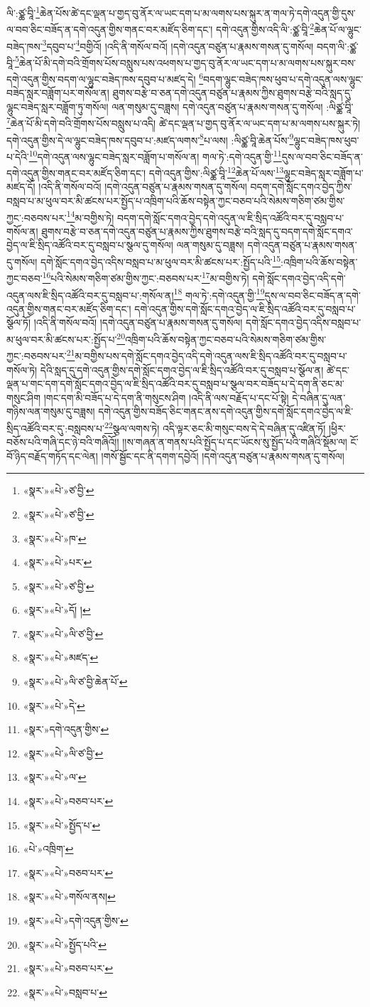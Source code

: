 ལི་:ཙྪ་བཱི་\footnote{«སྣར་»«པེ་»ཙ་བྱི་}ཆེན་པོས་ཚེ་དང་ལྡན་པ་གྱད་བུ་ནོར་ལ་ཡང་དག་པ་མ་ལགས་པས་སྐུར་ན་གལ་ཏེ་དགེ་འདུན་གྱི་དུས་ལ་བབ་ཅིང་བཟོད་ན་དགེ་འདུན་གྱིས་གནང་བར་མཛོད་ཅིག་དང་། དགེ་འདུན་གྱིས་འདི་ལི་:ཙྪ་བཱི་\footnote{«སྣར་»«པེ་»ཙ་བྱི་}ཆེན་པོ་ལ་ལྷུང་བཟེད་ཁས་\footnote{«སྣར་»«པེ་»ཁ་}དབུབ་པ་\footnote{«སྣར་»«པེ་»པར་}བགྱིའོ། །འདི་ནི་གསོལ་བའོ། །དགེ་འདུན་བཙུན་པ་རྣམས་གསན་དུ་གསོལ། བདག་ལི་:ཙྪ་བཱི་\footnote{«སྣར་»«པེ་»ཙ་བྱི་}ཆེན་པོ་མི་དགེ་བའི་གྲོགས་པོས་བསླུས་པས་འཕགས་པ་གྱད་བུ་ནོར་ལ་ཡང་དག་པ་མ་ལགས་པས་སྐུར་བས་དགེ་འདུན་གྱིས་བདག་ལ་ལྷུང་བཟེད་ཁས་དབུབ་པ་མཛད་དེ། \footnote{«སྣར་»«པེ་»དོ། ། }བདག་ལྷུང་བཟེད་ཁས་ཕུབ་པ་དགེ་འདུན་ལས་ལྷུང་བཟེད་སླར་བཟློག་པར་གསོལ་ན། ཐུགས་བརྩེ་བ་ཅན་དགེ་འདུན་བཙུན་པ་རྣམས་ཀྱིས་ཐུགས་བརྩེ་བའི་སླད་དུ་ལྷུང་བཟེད་སླར་བཟློག་ཏུ་གསོལ། ལན་གསུམ་དུ་བཟླས། དགེ་འདུན་བཙུན་པ་རྣམས་གསན་དུ་གསོལ། :ལིཙྪ་བཱི་\footnote{«སྣར་»«པེ་»ལི་ཙ་བྱི་}ཆེན་པོ་མི་དགེ་བའི་གྲོགས་པོས་བསླུས་པ་འདི། ཚེ་དང་ལྡན་པ་གྱད་བུ་ནོར་ལ་ཡང་དག་པ་མ་ལགས་པས་སྐུར་ཏེ། དགེ་འདུན་གྱིས་དེ་ལ་ལྷུང་བཟེད་ཁས་དབུབ་པ་:མཛད་ལགས་\footnote{«སྣར་»«པེ་»མཛད་}པ་ལས། :ལིཙྪ་བཱི་ཆེན་པོས་\footnote{«སྣར་»«པེ་»ལི་ཙ་བྱི་ཆེན་པོ་}ལྷུང་བཟེད་ཁས་ཕུབ་པ་དེའི་\footnote{«སྣར་»«པེ་»དེ་}དགེ་འདུན་ལས་ལྷུང་བཟེད་སླར་བཟློག་པ་གསོལ་ན། གལ་ཏེ་:དགེ་འདུན་གྱི་\footnote{«སྣར་»དགེ་འདུན་གྱིས་}དུས་ལ་བབ་ཅིང་བཟོད་ན་དགེ་འདུན་གྱིས་གནང་བར་མཛོད་ཅིག་དང་། དགེ་འདུན་གྱིས་:ལིཙྪ་བཱི་\footnote{«སྣར་»«པེ་»ལི་ཙ་བྱི་}ཆེན་པོ་ལས་\footnote{«སྣར་»«པེ་»ལ་}ལྷུང་བཟེད་སླར་བཟློག་པ་མཛད་དོ། །འདི་ནི་གསོལ་བའོ། །དགེ་འདུན་བཙུན་པ་རྣམས་གསན་དུ་གསོལ། བདག་དགེ་སློང་དགའ་བྱེད་ཀྱིས་བསླབ་པ་མ་ཕུལ་བར་མི་ཚངས་པར་སྤྱོད་པ་འཁྲིག་པའི་ཆོས་བསྟེན་ཀྱང་བཅབ་པའི་སེམས་གཅིག་ཙམ་གྱིས་ཀྱང་:བཅབས་པར་\footnote{«སྣར་»«པེ་»བཅབ་པར་}མ་བགྱིས་ཏེ། བདག་དགེ་སློང་དགའ་བྱེད་དགེ་འདུན་ལ་ཇི་སྲིད་འཚོའི་བར་དུ་བསླབ་པ་གསོལ་ན། ཐུགས་བརྩེ་བ་ཅན་དགེ་འདུན་བཙུན་པ་རྣམས་ཀྱིས་ཐུགས་བརྩེ་བའི་སླད་དུ་བདག་དགེ་སློང་དགའ་བྱེད་ལ་ཇི་སྲིད་འཚོའི་བར་དུ་བསླབ་པ་སྩལ་དུ་གསོལ། ལན་གསུམ་དུ་བཟླས། དགེ་འདུན་བཙུན་པ་རྣམས་གསན་དུ་གསོལ། དགེ་སློང་དགའ་བྱེད་འདིས་བསླབ་པ་མ་ཕུལ་བར་མི་ཚངས་པར་:སྤྱོད་པའི་\footnote{«སྣར་»«པེ་»སྤྱོད་པ་}:འཁྲིག་པའི་ཆོས་བསྟེན་ཀྱང་བཅབ་\footnote{«པེ་»འཁྲིག་}པའི་སེམས་གཅིག་ཙམ་གྱིས་ཀྱང་:བཅབས་པར་\footnote{«སྣར་»«པེ་»བཅབ་པར་}མ་བགྱིས་ཏེ། དགེ་སློང་དགའ་བྱེད་འདི་དགེ་འདུན་ལས་ཇི་སྲིད་འཚོའི་བར་དུ་བསླབ་པ་:གསོལ་ན།\footnote{«སྣར་»«པེ་»གསོལ་ནས།} གལ་ཏེ་:དགེ་འདུན་གྱི་\footnote{«སྣར་»«པེ་»དགེ་འདུན་གྱིས་}དུས་ལ་བབ་ཅིང་བཟོད་ན་དགེ་འདུན་གྱིས་གནང་བར་མཛོད་ཅིག་དང་། དགེ་འདུན་གྱིས་དགེ་སློང་དགའ་བྱེད་ལ་ཇི་སྲིད་འཚོའི་བར་དུ་བསླབ་པ་སྩོལ་ཏོ། །འདི་ནི་གསོལ་བའོ། །དགེ་འདུན་བཙུན་པ་རྣམས་གསན་དུ་གསོལ། དགེ་སློང་དགའ་བྱེད་འདིས་བསླབ་པ་མ་ཕུལ་བར་མི་ཚངས་པར་:སྤྱོད་པ་\footnote{«སྣར་»«པེ་»སྤྱོད་པའི་}འཁྲིག་པའི་ཆོས་བསྟེན་ཀྱང་བཅབ་པའི་སེམས་གཅིག་ཙམ་གྱིས་ཀྱང་:བཅབས་པར་\footnote{«སྣར་»«པེ་»བཅབ་པར་}མ་བགྱིས་པས་དགེ་སློང་དགའ་བྱེད་འདི་དགེ་འདུན་ལས་ཇི་སྲིད་འཚོའི་བར་དུ་བསླབ་པ་གསོལ་ཏེ། དེའི་སླད་དུ་དགེ་འདུན་གྱིས་དགེ་སློང་དགའ་བྱེད་ལ་ཇི་སྲིད་འཚོའི་བར་དུ་བསླབ་པ་སྩོལ་ན། ཚེ་དང་ལྡན་པ་གང་དག་དགེ་སློང་དགའ་བྱེད་ལ་ཇི་སྲིད་འཚོའི་བར་དུ་བསླབ་པ་སྩལ་བར་བཟོད་པ་དེ་དག་ནི་ཅང་མ་གསུང་ཤིག །གང་དག་མི་བཟོད་པ་དེ་དག་ནི་གསུངས་ཤིག །འདི་ནི་ལས་བརྗོད་པ་དང་པོ་སྟེ། དེ་བཞིན་དུ་ལན་གཉིས་ལན་གསུམ་དུ་བཟླས། དགེ་འདུན་གྱིས་བཟོད་ཅིང་གནང་ནས་དགེ་འདུན་གྱིས་དགེ་སློང་དགའ་བྱེད་ལ་ཇི་སྲིད་འཚོའི་བར་དུ་:བསླབས་པ་\footnote{«སྣར་»«པེ་»བསླབ་པ་}སྩལ་ལགས་ཏེ། འདི་ལྟར་ཅང་མི་གསུང་བས་དེ་དེ་བཞིན་དུ་འཛིན་ཏོ། །ཕྱིར་བཅོས་པའི་གཞི་དང་ཉེ་བའི་གཞིའོ།། །།ས་གཞན་ན་གནས་པའི་སྤྱོད་པ་དང་ཡོངས་སུ་སྤྱོད་པའི་གཞིའི་སྡོམ་ལ། ངོ་བོ་ཉིད་བརྗོད་གཏོད་དང་ལེན། །གསོ་སྦྱོང་དང་ནི་དགག་དབྱེའོ། །དགེ་འདུན་བཙུན་པ་རྣམས་གསན་དུ་གསོལ། 